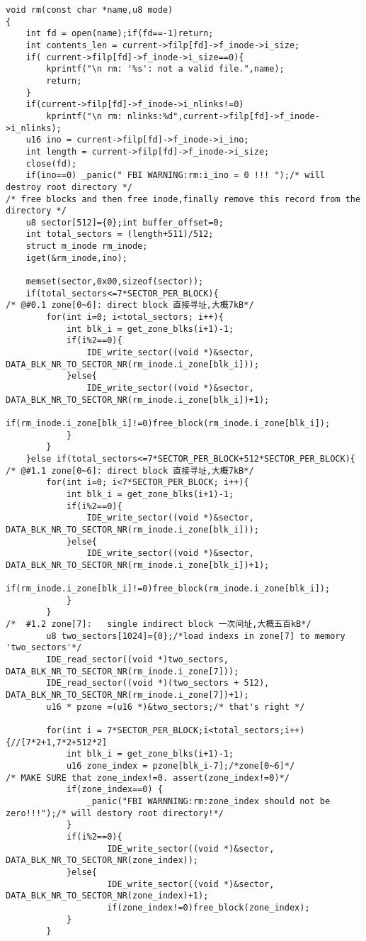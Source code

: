 \begin{verbatim}   
void rm(const char *name,u8 mode)
{
	int fd = open(name);if(fd==-1)return;
	int contents_len = current->filp[fd]->f_inode->i_size;
	if( current->filp[fd]->f_inode->i_size==0){
		kprintf("\n rm: '%s': not a valid file.",name);
		return;
	}
	if(current->filp[fd]->f_inode->i_nlinks!=0)
		kprintf("\n rm: nlinks:%d",current->filp[fd]->f_inode->i_nlinks);
	u16 ino = current->filp[fd]->f_inode->i_ino;
	int length = current->filp[fd]->f_inode->i_size;
	close(fd);
	if(ino==0) _panic(" FBI WARNING:rm:i_ino = 0 !!! ");/* will destroy root directory */
/* free blocks and then free inode,finally remove this record from the directory */	
	u8 sector[512]={0};int buffer_offset=0;
	int total_sectors = (length+511)/512;
	struct m_inode rm_inode;
	iget(&rm_inode,ino);

	memset(sector,0x00,sizeof(sector));
	if(total_sectors<=7*SECTOR_PER_BLOCK){
/* @#0.1 zone[0~6]: direct block 直接寻址,大概7kB*/
		for(int i=0; i<total_sectors; i++){
			int blk_i = get_zone_blks(i+1)-1;
			if(i%2==0){
				IDE_write_sector((void *)&sector, DATA_BLK_NR_TO_SECTOR_NR(rm_inode.i_zone[blk_i]));
			}else{
				IDE_write_sector((void *)&sector, DATA_BLK_NR_TO_SECTOR_NR(rm_inode.i_zone[blk_i])+1);
				if(rm_inode.i_zone[blk_i]!=0)free_block(rm_inode.i_zone[blk_i]);	
			}
		}
	}else if(total_sectors<=7*SECTOR_PER_BLOCK+512*SECTOR_PER_BLOCK){
/* @#1.1 zone[0~6]: direct block 直接寻址,大概7kB*/		
		for(int i=0; i<7*SECTOR_PER_BLOCK; i++){
			int blk_i = get_zone_blks(i+1)-1;
			if(i%2==0){
				IDE_write_sector((void *)&sector, DATA_BLK_NR_TO_SECTOR_NR(rm_inode.i_zone[blk_i]));
			}else{
				IDE_write_sector((void *)&sector, DATA_BLK_NR_TO_SECTOR_NR(rm_inode.i_zone[blk_i])+1);	
				if(rm_inode.i_zone[blk_i]!=0)free_block(rm_inode.i_zone[blk_i]);
			}
		}
/*  #1.2 zone[7]:   single indirect block 一次间址,大概五百kB*/
		u8 two_sectors[1024]={0};/*load indexs in zone[7] to memory 'two_sectors'*/
		IDE_read_sector((void *)two_sectors, DATA_BLK_NR_TO_SECTOR_NR(rm_inode.i_zone[7]));
		IDE_read_sector((void *)(two_sectors + 512), DATA_BLK_NR_TO_SECTOR_NR(rm_inode.i_zone[7])+1);
		u16 * pzone =(u16 *)&two_sectors;/* that's right */

		for(int i = 7*SECTOR_PER_BLOCK;i<total_sectors;i++){//[7*2+1,7*2+512*2]
			int blk_i = get_zone_blks(i+1)-1;
			u16 zone_index = pzone[blk_i-7];/*zone[0~6]*/
/* MAKE SURE that zone_index!=0. assert(zone_index!=0)*/			
			if(zone_index==0) {
				_panic("FBI WARNNING:rm:zone_index should not be zero!!!");/* will destory root directory!*/			
			}
			if(i%2==0){
					IDE_write_sector((void *)&sector, DATA_BLK_NR_TO_SECTOR_NR(zone_index));
			}else{
					IDE_write_sector((void *)&sector, DATA_BLK_NR_TO_SECTOR_NR(zone_index)+1);
					if(zone_index!=0)free_block(zone_index);
			}
		}


\end{verbatim}
